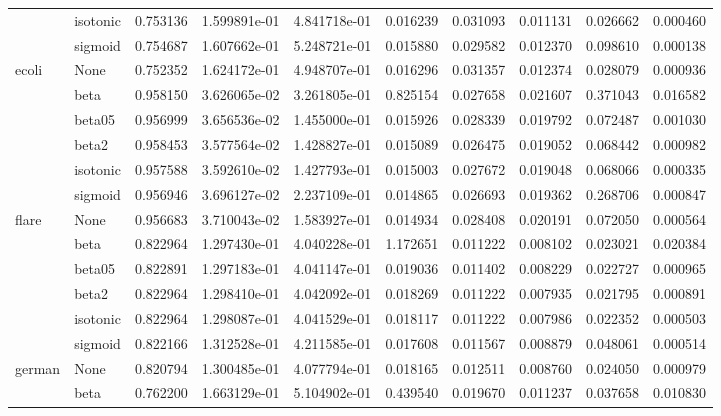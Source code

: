 \begin{tabular}{llrrrrrrrr}
        & isotonic &  0.753136 &  1.599891e-01 &  4.841718e-01 &   0.016239 &  0.031093 &  0.011131 &  0.026662 &  0.000460 \\
        & sigmoid &  0.754687 &  1.607662e-01 &  5.248721e-01 &   0.015880 &  0.029582 &  0.012370 &  0.098610 &  0.000138 \\
ecoli & None &  0.752352 &  1.624172e-01 &  4.948707e-01 &   0.016296 &  0.031357 &  0.012374 &  0.028079 &  0.000936 \\
        & beta &  0.958150 &  3.626065e-02 &  3.261805e-01 &   0.825154 &  0.027658 &  0.021607 &  0.371043 &  0.016582 \\
        & beta05 &  0.956999 &  3.656536e-02 &  1.455000e-01 &   0.015926 &  0.028339 &  0.019792 &  0.072487 &  0.001030 \\
        & beta2 &  0.958453 &  3.577564e-02 &  1.428827e-01 &   0.015089 &  0.026475 &  0.019052 &  0.068442 &  0.000982 \\
        & isotonic &  0.957588 &  3.592610e-02 &  1.427793e-01 &   0.015003 &  0.027672 &  0.019048 &  0.068066 &  0.000335 \\
        & sigmoid &  0.956946 &  3.696127e-02 &  2.237109e-01 &   0.014865 &  0.026693 &  0.019362 &  0.268706 &  0.000847 \\
flare & None &  0.956683 &  3.710043e-02 &  1.583927e-01 &   0.014934 &  0.028408 &  0.020191 &  0.072050 &  0.000564 \\
        & beta &  0.822964 &  1.297430e-01 &  4.040228e-01 &   1.172651 &  0.011222 &  0.008102 &  0.023021 &  0.020384 \\
        & beta05 &  0.822891 &  1.297183e-01 &  4.041147e-01 &   0.019036 &  0.011402 &  0.008229 &  0.022727 &  0.000965 \\
        & beta2 &  0.822964 &  1.298410e-01 &  4.042092e-01 &   0.018269 &  0.011222 &  0.007935 &  0.021795 &  0.000891 \\
        & isotonic &  0.822964 &  1.298087e-01 &  4.041529e-01 &   0.018117 &  0.011222 &  0.007986 &  0.022352 &  0.000503 \\
        & sigmoid &  0.822166 &  1.312528e-01 &  4.211585e-01 &   0.017608 &  0.011567 &  0.008879 &  0.048061 &  0.000514 \\
german & None &  0.820794 &  1.300485e-01 &  4.077794e-01 &   0.018165 &  0.012511 &  0.008760 &  0.024050 &  0.000979 \\
        & beta &  0.762200 &  1.663129e-01 &  5.104902e-01 &   0.439540 &  0.019670 &  0.011237 &  0.037658 &  0.010830 \\

\end{tabular}
